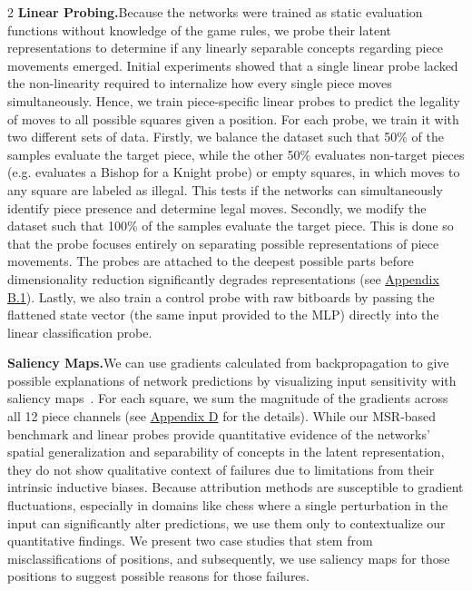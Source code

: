 \documentclass[a4paper,10pt]{article}
\begin{document}
\begin{multicols*}{2}
\textbf{Linear Probing.}\enskip Because the networks were trained as static evaluation functions without knowledge of the game rules, we probe their latent representations to determine if any linearly separable concepts regarding piece movements emerged. Initial experiments showed that a single linear probe lacked the non-linearity required to internalize how every single piece moves simultaneously. Hence, we train piece-specific linear probes to predict the legality of moves to all possible squares given a position. For each probe, we train it with two different sets of data. Firstly, we balance the dataset such that 50\% of the samples evaluate the target piece, while the other 50\% evaluates non-target pieces (e.g. evaluates a Bishop for a Knight probe) or empty squares, in which moves to any square are labeled as illegal. This tests if the networks can simultaneously identify piece presence and determine legal moves. Secondly, we modify the dataset such that 100\% of the samples evaluate the target piece. This is done so that the probe focuses entirely on separating possible representations of piece movements. The probes are attached to the deepest possible parts before dimensionality reduction significantly degrades representations (see \hyperref[probe_locations]{Appendix B.1}). Lastly, we also train a control probe with raw bitboards by passing the flattened state vector (the same input provided to the MLP) directly into the linear classification probe.

\textbf{Saliency Maps.}\enskip We can use gradients calculated from backpropagation to give possible explanations of network predictions by visualizing input sensitivity with saliency maps~\cite{simonyan2013deep}. For each square, we sum the magnitude of the gradients across all 12 piece channels (see \hyperref[sec:saliency_maps]{Appendix D} for the details). While our MSR-based benchmark and linear probes provide quantitative evidence of the networks' spatial generalization and separability of concepts in the latent representation, they do not show qualitative context of failures due to limitations from their intrinsic inductive biases. Because attribution methods are susceptible to gradient fluctuations, especially in domains like chess where a single perturbation in the input can significantly alter predictions, we use them only to contextualize our quantitative findings. We present two case studies that stem from misclassifications of positions, and subsequently, we use saliency maps for those positions to suggest possible reasons for those failures.


\end{multicols*}
\end{document}

